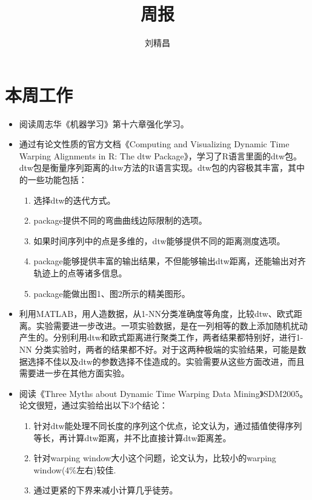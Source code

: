 \documentclass{ctexart}
\begin{document}
\title{周报}
\author{刘精昌}
\maketitle

\fangsong
\section*{本周工作}
\begin{itemize}
  \item 阅读周志华《机器学习》第十六章强化学习。
  \item 通过有论文性质的官方文档《Computing and Visualizing Dynamic Time Warping Alignments in R: The dtw Package》，学习了R语言里面的dtw包。dtw包是衡量序列距离的dtw方法的R语言实现。dtw包的内容极其丰富，其中的一些功能包括：
      \begin{enumerate}
        \item 选择dtw的迭代方式。
        \item package提供不同的弯曲曲线边际限制的选项。
        \item 如果时间序列中的点是多维的，dtw能够提供不同的距离测度选项。
        \item package能够提供丰富的输出结果，不但能够输出dtw距离，还能输出对齐轨迹上的点等诸多信息。
        \item package能做出图1、图2所示的精美图形。
      \end{enumerate}
  \item 利用MATLAB，用人造数据，从1-NN分类准确度等角度，比较dtw、欧式距离。实验需要进一步改进。一项实验数据，是在一列相等的数上添加随机扰动产生的。分别利用dtw和欧式距离进行聚类工作，两者结果都特别好，进行1-NN 分类实验时，两者的结果都不好。对于这两种极端的实验结果，可能是数据选择不佳以及dtw的参数选择不佳造成的。实验需要从这些方面改进，而且需要进一步在其他方面实验。
  \item 阅读《Three Myths about Dynamic Time Warping Data Mining》SDM2005。论文很短，通过实验给出以下3个结论：
      \begin{enumerate}
        \item 针对dtw能处理不同长度的序列这个优点，论文认为，通过插值使得序列等长，再计算dtw距离，并不比直接计算dtw距离差。
        \item 针对warping window大小这个问题，论文认为，比较小的warping window(4\%左右)较佳.
        \item 通过更紧的下界来减小计算几乎徒劳。
      \end{enumerate}
\end{itemize}
\end{document}
